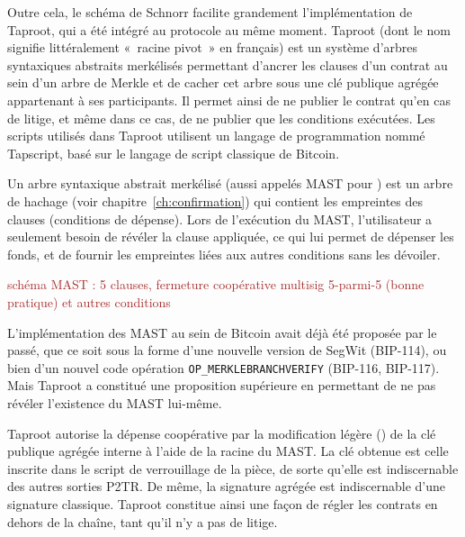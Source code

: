 Outre cela, le schéma de Schnorr facilite grandement l'implémentation de Taproot, qui a été intégré au protocole au même moment. Taproot (dont le nom signifie littéralement «~racine pivot~» en français) est un système d'arbres syntaxiques abstraits merkélisés permettant d'ancrer les clauses d'un contrat au sein d'un arbre de Merkle et de cacher cet arbre sous une clé publique agrégée appartenant à ses participants. Il permet ainsi de ne publier le contrat qu'en cas de litige, et même dans ce cas, de ne publier que les conditions exécutées. Les scripts utilisés dans Taproot utilisent un langage de programmation nommé Tapscript, basé sur le langage de script classique de Bitcoin.

Un arbre syntaxique abstrait merkélisé (aussi appelés MAST pour ) est un arbre de hachage (voir chapitre~\ref{ch:confirmation}) qui contient les empreintes des clauses (conditions de dépense). Lors de l'exécution du MAST, l'utilisateur a seulement besoin de révéler la clause appliquée, ce qui lui permet de dépenser les fonds, et de fournir les empreintes liées aux autres conditions sans les dévoiler.

\textcolor{brown}{schéma MAST : 5 clauses, fermeture coopérative multisig 5-parmi-5 (bonne pratique) et autres conditions}

L'implémentation des MAST au sein de Bitcoin avait déjà été proposée par le passé, que ce soit sous la forme d'une nouvelle version de SegWit (BIP-114), ou bien d'un nouvel code opération \texttt{OP\_MERKLEBRANCHVERIFY} (BIP-116, BIP-117). Mais Taproot a constitué une proposition supérieure en permettant de ne pas révéler l'existence du MAST lui-même.

Taproot autorise la dépense coopérative par la modification légère () de la clé publique agrégée interne à l'aide de la racine du MAST. La clé obtenue est celle inscrite dans le script de verrouillage de la pièce, de sorte qu'elle est indiscernable des autres sorties P2TR. De même, la signature agrégée est indiscernable d'une signature classique. Taproot constitue ainsi une façon de régler les contrats en dehors de la chaîne, tant qu'il n'y a pas de litige.

